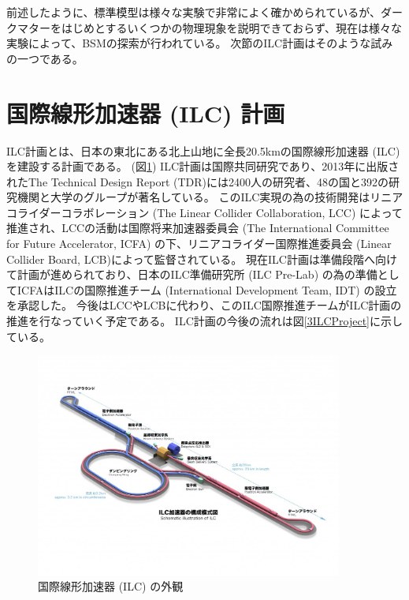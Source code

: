 前述したように、標準模型は様々な実験で非常によく確かめられているが、ダークマターをはじめとするいくつかの物理現象を説明できておらず、現在は様々な実験によって、BSMの探索が行われている。
次節のILC計画はそのような試みの一つである。

\section{国際線形加速器 (ILC) 計画} \label{Intro:InternationalLinearColliderProject}

ILC計画とは、日本の東北にある北上山地に全長20.5kmの国際線形加速器 (ILC) を建設する計画である。 (図\ref{2InternationalLinearCollider})
ILC計画は国際共同研究であり、2013年に出版されたThe Technical Design Report (TDR)には2400人の研究者、48の国と392の研究機関と大学のグループが著名している。
このILC実現の為の技術開発はリニアコライダーコラボレーション (The Linear Collider Collaboration, LCC) によって推進され、LCCの活動は国際将来加速器委員会 (The International Committee for Future Accelerator, ICFA) の下、リニアコライダー国際推進委員会 (Linear Collider Board, LCB)によって監督されている。
現在ILC計画は準備段階へ向けて計画が進められており、日本のILC準備研究所 (ILC Pre-Lab) の為の準備としてICFAはILCの国際推進チーム (International Development Team, IDT) の設立を承認した。
今後はLCCやLCBに代わり、このILC国際推進チームがILC計画の推進を行なっていく予定である。
ILC計画の今後の流れは図\ref{3ILCProject}に示している。

\begin{figure}[h]
 \centering
 \includegraphics[width=0.9\textwidth]{Figure/1Introduction/2InternationalLinearCollider.jpg}
 \caption{国際線形加速器 (ILC) の外観}
 \label{2InternationalLinearCollider}
\end{figure}

